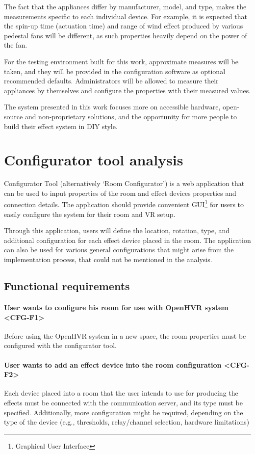 The fact that the appliances differ by manufacturer, model, and type,
makes the measurements specific to each individual device.
For example, it is expected that the spin-up time
(actuation time) and range of wind effect produced by various pedestal fans
will be different, as such properties heavily depend on the power of the fan.

\pagebreak

For the testing environment built for this work, approximate measures will be
taken, and they will be provided in the configuration software as optional
recommended defaults. Administrators will be allowed
to measure their appliances by themselves and configure the properties with
their measured values.


The system presented in this work focuses more
on accessible hardware, open-source and non-proprietary solutions, and
the opportunity for more people to build their effect system in DIY style.


\section{Configurator tool analysis}\label{analysis:conftool}
Configurator Tool (alternatively `Room Configurator') is a web application that
can be used to input properties of the room and effect devices properties and
connection details.
The application should provide convenient GUI\footnote{Graphical User Interface}
for users to easily configure the system for their room and VR setup.


Through this application, users will define the location, rotation, type, and
additional configuration for each effect device placed in the room. The application
can also be used for various general configurations that might arise from
the implementation process, that could not be mentioned in the analysis.


\subsection{Functional requirements}
\paragraph*{User wants to configure his room for use with OpenHVR system <CFG-F1>}
\label{cfg-f1}
Before using the OpenHVR system in a new space,
the room properties must be configured with the configurator tool.


\paragraph*{User wants to add an effect device into the room configuration <CFG-F2>}
\label{cfg-f2}
Each device placed into a room that the user intends to use for producing the effects
must be connected with the communication server, and its type must be specified.
Additionally, more configuration might be required, depending on the type
of the device (e.g., thresholds, relay/channel selection, hardware limitations)


